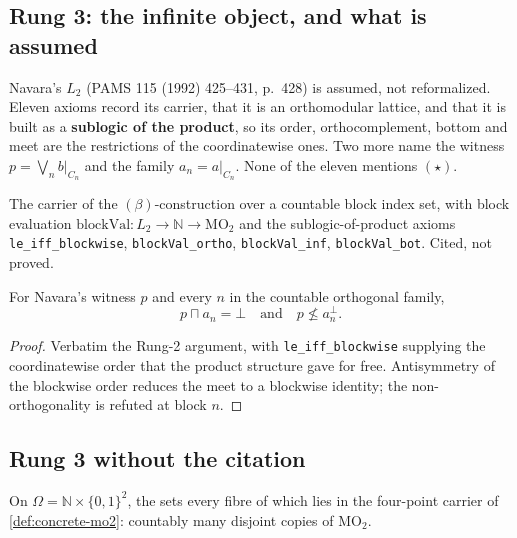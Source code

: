 \subsection{Rung 3: the infinite object, and what is assumed}

Navara's $L_2$ (PAMS 115 (1992) 425--431, p.~428) is assumed, not reformalized.
Eleven axioms record its carrier, that it is an orthomodular lattice, and that
it is built as a \textbf{sublogic of the product}, so its order,
orthocomplement, bottom and meet are the restrictions of the coordinatewise
ones. Two more name the witness $p = \bigvee_n b|_{C_n}$ and the family
$a_n = a|_{C_n}$. None of the eleven mentions $(\star)$.

\begin{definition}
  \label{def:navara-l2}
  \leanok
  The carrier of the $(\beta)$-construction over a countable block index set,
  with block evaluation $\mathrm{blockVal} : L_2 \to \mathbb{N} \to
  \mathrm{MO}_2$ and the sublogic-of-product axioms
  \texttt{le\_iff\_blockwise}, \texttt{blockVal\_ortho}, \texttt{blockVal\_inf},
  \texttt{blockVal\_bot}. Cited, not proved.
\end{definition}

\begin{theorem}
  \label{thm:star-infinite}
  \leanok
  For Navara's witness $p$ and every $n$ in the countable orthogonal family,
  \[ p \sqcap a_n = \bot \quad\text{and}\quad p \not\le a_n^{\perp}. \]
\end{theorem}

\begin{proof}
  \leanok
  Verbatim the Rung-2 argument, with \texttt{le\_iff\_blockwise} supplying the
  coordinatewise order that the product structure gave for free. Antisymmetry of
  the blockwise order reduces the meet to a blockwise identity; the
  non-orthogonality is refuted at block $n$.
\end{proof}
\subsection{Rung 3 without the citation}

\begin{definition}
  \label{def:concrete-descent}
  \leanok
  On $\Omega = \mathbb{N} \times \{0,1\}^{2}$, the sets every fibre of which
  lies in the four-point carrier of \ref{def:concrete-mo2}: countably many
  disjoint copies of MO$_2$.
\end{definition}

